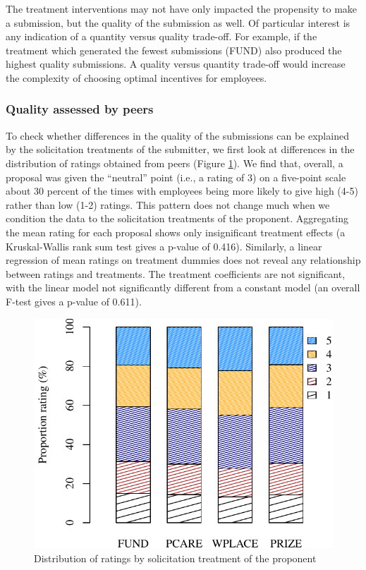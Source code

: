 \documentclass[11pt, titlepage]{article}
\begin{document}
The treatment interventions may not have only impacted the propensity to
make a submission, but the quality of the submission as well. Of
particular interest is any indication of a quantity versus quality
trade-off. For example, if the treatment which generated the fewest
submissions (FUND) also produced the highest quality submissions. A
quality versus quantity trade-off would increase the complexity of
choosing optimal incentives for employees.

\subsubsection{Quality assessed by
peers}\label{quality-assessed-by-peers}

To check whether differences in the quality of the submissions can be
explained by the solicitation treatments of the submitter, we first look
at differences in the distribution of ratings obtained from peers
(Figure \ref{ratings}). We find that, overall, a proposal was given the
``neutral'' point (i.e., a rating of 3) on a five-point scale about 30
percent of the times with employees being more likely to give high (4-5)
rather than low (1-2) ratings. This pattern does not change much when we
condition the data to the solicitation treatments of the proponent.
Aggregating the mean rating for each proposal shows only insignificant
treatment effects (a Kruskal-Wallis rank sum test gives a p-value of
0.416). Similarly, a linear regression of mean ratings on treatment
dummies does not reveal any relationship between ratings and treatments.
The treatment coefficients are not significant, with the linear model
not significantly different from a constant model (an overall F-test
gives a p-value of 0.611).

\begin{figure}
  \centering
  \caption{Distribution of ratings by solicitation treatment of the proponent}
  \label{ratings}
  \includegraphics{figures/figure_ratings-1.pdf}
\end{figure}
\end{document}
